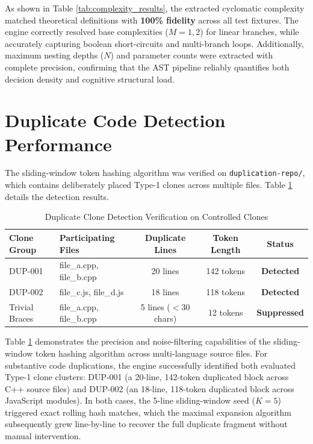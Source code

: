 As shown in Table \ref{tab:complexity_results}, the extracted cyclomatic complexity matched theoretical definitions with \textbf{100\% fidelity} across all test fixtures. The engine correctly resolved base complexities ($M = 1, 2$) for linear branches, while accurately capturing boolean short-circuits and multi-branch loops. Additionally, maximum nesting depths ($N$) and parameter counts were extracted with complete precision, confirming that the AST pipeline reliably quantifies both decision density and cognitive structural load.

\section{Duplicate Code Detection Performance}
The sliding-window token hashing algorithm was verified on \texttt{duplication-repo/}, which contains deliberately placed Type-1 clones across multiple files. Table \ref{tab:clone_results} details the detection results.

\begin{table}[htbp]
\centering
\footnotesize
\caption{Duplicate Clone Detection Verification on Controlled Clones}
\label{tab:clone_results}
\vspace{0.15cm}
\renewcommand{\arraystretch}{1.2}
\begin{tabularx}{\textwidth}{@{}lp{4.2cm}ccc@{}}
\toprule
\textbf{Clone Group} & \textbf{Participating Files} & \textbf{Duplicate Lines} & \textbf{Token Length} & \textbf{Status} \\
\midrule
DUP-001        & file\_a.cpp, file\_b.cpp & 20 lines              & 142 tokens & \textbf{Detected}   \\
DUP-002        & file\_c.js, file\_d.js   & 18 lines              & 118 tokens & \textbf{Detected}   \\
Trivial Braces & file\_a.cpp, file\_b.cpp & 5 lines ($<30$ chars) & 12 tokens  & \textbf{Suppressed} \\
\bottomrule
\end{tabularx}
\end{table}

Table \ref{tab:clone_results} demonstrates the precision and noise-filtering capabilities of the sliding-window token hashing algorithm across multi-language source files. For substantive code duplications, the engine successfully identified both evaluated Type-1 clone clusters: DUP-001 (a 20-line, 142-token duplicated block across C++ source files) and DUP-002 (an 18-line, 118-token duplicated block across JavaScript modules). In both cases, the 5-line sliding-window seed ($K = 5$) triggered exact rolling hash matches, which the maximal expansion algorithm subsequently grew line-by-line to recover the full duplicate fragment without manual intervention.

